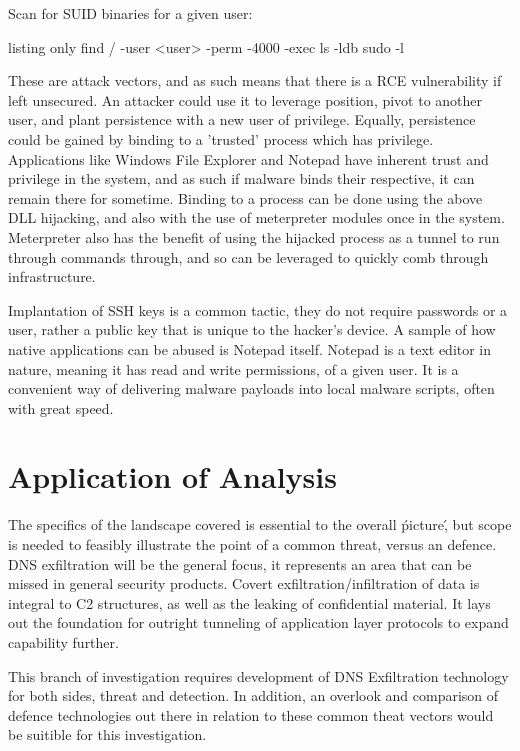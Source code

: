 Scan for SUID binaries for a given user:
\begin{tcblisting}{listing only}
find / -user <user> -perm -4000 -exec ls -ldb {} \;
sudo -l
\end{tcblisting}

These are attack vectors, and as such means that there is a RCE vulnerability if left unsecured. An attacker could use it to leverage position, pivot to another user, and plant persistence with a new user of privilege. Equally, persistence could be gained by binding to
a 'trusted' process which has privilege. Applications like Windows File Explorer and Notepad have inherent trust and privilege in the system, and as such if malware binds their respective, it can remain there for sometime. Binding to a process can be done using the above DLL hijacking,
and also with the use of meterpreter modules once in the system. Meterpreter also has the benefit of using the hijacked process as a tunnel to run through commands through, and so can be leveraged to quickly comb through infrastructure. 

Implantation of SSH keys is a common tactic, they do not require passwords or a user, rather a public key that is unique to the hacker's device. A sample of how native applications can be abused is Notepad itself. Notepad is a text editor in nature, meaning it has read and write permissions, of a given user. It is a convenient way of delivering malware payloads into local malware scripts, often with great speed.


\chapter{Application of Analysis}
The specifics of the landscape covered is essential to the overall \'picture\', but scope is needed to feasibly illustrate the point of a common threat, versus an defence.
DNS exfiltration will be the general focus, it represents an area that can be missed in general security products. Covert exfiltration/infiltration of data is integral to 
C2 structures, as well as the leaking of confidential material. It lays out the foundation for outright tunneling of application layer protocols to expand capability further. 

This branch of investigation requires development of DNS Exfiltration technology for both sides, threat and detection. In addition, an overlook and comparison of defence technologies out there in relation to these common theat vectors would be suitible for this investigation.


